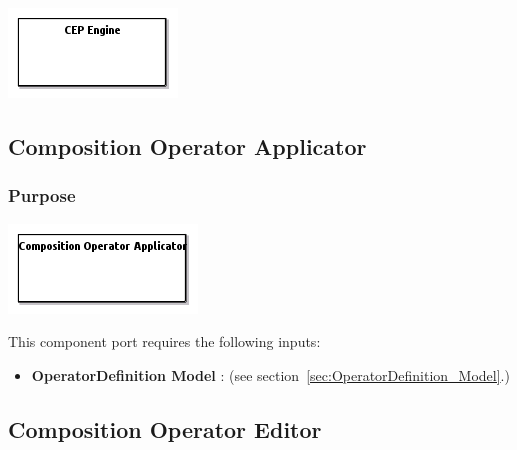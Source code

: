 \documentclass{gemoc} %
\begin{document}

\begin{center}
\includegraphics*[trim=0.0cm 0.0cm 0cm 0.0cm, clip=true]{../images/generated/Generated_CEP_Engine.png}
\end{center}




\subsection{Composition Operator Applicator}
\label{sec:Composition_Operator_Applicator}


\subsubsection{Purpose}


\begin{center}
\includegraphics*[trim=0.0cm 0.0cm 0cm 0.0cm, clip=true]{../images/generated/Generated_Composition_Operator_Applicator.png}
\end{center}

This component port requires the following inputs:
\begin{itemize}
  \item \textbf{OperatorDefinition Model} :
(see section~\ref{sec:OperatorDefinition_Model}.)
\end{itemize}



\subsection{Composition Operator Editor}
\label{sec:Composition_Operator_Editor}
\end{document}
